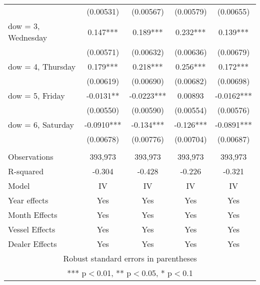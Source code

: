 \begin{tabular}{lcccc}
 & (0.00531) & (0.00567) & (0.00579) & (0.00655) \\
dow = 3, Wednesday & 0.147*** & 0.189*** & 0.232*** & 0.139*** \\
 & (0.00571) & (0.00632) & (0.00636) & (0.00679) \\
dow = 4, Thursday & 0.179*** & 0.218*** & 0.256*** & 0.172*** \\
 & (0.00619) & (0.00690) & (0.00682) & (0.00698) \\
dow = 5, Friday & -0.0131** & -0.0223*** & 0.00893 & -0.0162*** \\
 & (0.00550) & (0.00590) & (0.00554) & (0.00576) \\
dow = 6, Saturday & -0.0910*** & -0.134*** & -0.126*** & -0.0891*** \\
 & (0.00678) & (0.00776) & (0.00704) & (0.00687) \\
 &  &  &  &  \\
Observations & 393,973 & 393,973 & 393,973 & 393,973 \\
R-squared & -0.304 & -0.428 & -0.226 & -0.321 \\
Model & IV & IV & IV & IV \\
Year effects & Yes & Yes & Yes & Yes \\
Month Effects & Yes & Yes & Yes & Yes \\
Vessel Effects & Yes & Yes & Yes & Yes \\
 Dealer Effects & Yes & Yes & Yes & Yes \\ \hline
\multicolumn{5}{c}{ Robust standard errors in parentheses} \\
\multicolumn{5}{c}{ *** p$<$0.01, ** p$<$0.05, * p$<$0.1} \\
\end{tabular}
